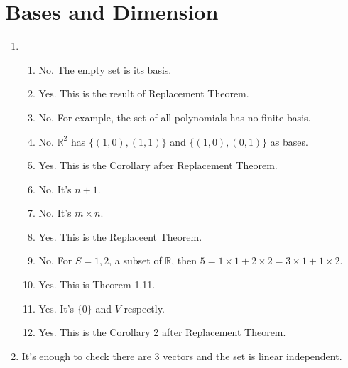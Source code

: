 \section{Bases and Dimension}
\begin{enumerate}
\item \begin{enumerate}
\item No. The empty set is its basis.
\item Yes. This is the result of Replacement Theorem.
\item No. For example, the set of all polynomials has no finite basis.
\item No. $\mathbb{R}^2$ has $\{(1,0),(1,1)\}$ and $\{(1,0),(0,1)\}$ as bases.
\item Yes. This is the Corollary after Replacement Theorem.
\item No. It's $n+1$.
\item No. It's $m\times n$.
\item Yes. This is the Replaceent Theorem.
\item No. For $S={1,2}$, a subset of $\mathbb{R}$, then $5=1\times 1+2\times 2=3\times 1+1\times 2$.
\item Yes. This is Theorem 1.11.
\item Yes. It's $\{0\}$ and $V$ respectly.
\item Yes. This is the Corollary 2 after Replacement Theorem.
\end{enumerate}
\item It's enough to check there are $3$ vectors and the set is linear independent.


\end{enumerate}

